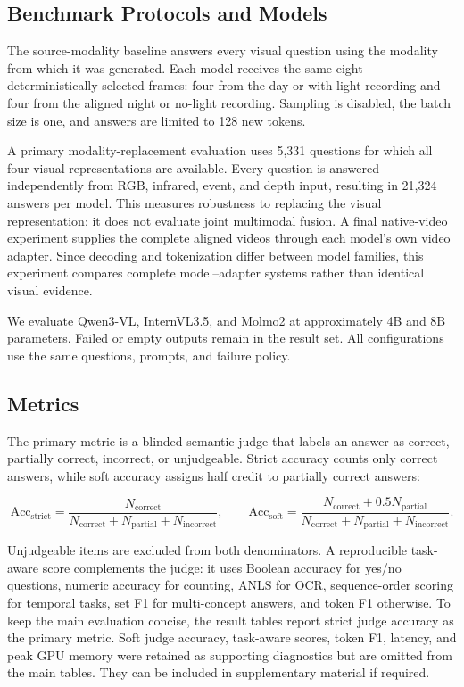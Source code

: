\subsection{Benchmark Protocols and Models}

The source-modality baseline answers every visual question using the modality
from which it was generated. Each model receives the same eight
deterministically selected frames: four from the day or with-light recording
and four from the aligned night or no-light recording. Sampling is disabled,
the batch size is one, and answers are limited to 128 new tokens.

A primary modality-replacement evaluation uses 5,331 questions for which all four visual
representations are available. Every question is answered independently from
RGB, infrared, event, and depth input, resulting in 21,324 answers per model.
This measures robustness to replacing the visual representation; it does not
evaluate joint multimodal fusion. A final native-video experiment supplies the
complete aligned videos through each model's own video adapter. Since decoding
and tokenization differ between model families, this experiment compares
complete model--adapter systems rather than identical visual evidence.

We evaluate Qwen3-VL, InternVL3.5, and Molmo2 at approximately 4B and 8B
parameters. Failed or empty outputs remain in the result set. All configurations
use the same questions, prompts, and failure policy.


\subsection{Metrics}

The primary metric is a blinded semantic judge that labels an answer as
correct, partially correct, incorrect, or unjudgeable. Strict accuracy counts
only correct answers, while soft accuracy assigns half credit to partially
correct answers:

\[
\mathrm{Acc}_{\mathrm{strict}} =
\frac{N_{\mathrm{correct}}}
{N_{\mathrm{correct}}+N_{\mathrm{partial}}+N_{\mathrm{incorrect}}},
\qquad
\mathrm{Acc}_{\mathrm{soft}} =
\frac{N_{\mathrm{correct}}+0.5N_{\mathrm{partial}}}
{N_{\mathrm{correct}}+N_{\mathrm{partial}}+N_{\mathrm{incorrect}}}.
\]

Unjudgeable items are excluded from both denominators. A reproducible
task-aware score complements the judge: it uses Boolean accuracy for yes/no
questions, numeric accuracy for counting, ANLS for OCR, sequence-order scoring
for temporal tasks, set F1 for multi-concept answers, and token F1 otherwise.
To keep the main evaluation concise, the result tables report strict judge
accuracy as the primary metric. Soft judge accuracy, task-aware scores, token
F1, latency, and peak GPU memory were retained as supporting diagnostics but
are omitted from the main tables. They can be included in supplementary
material if required.



